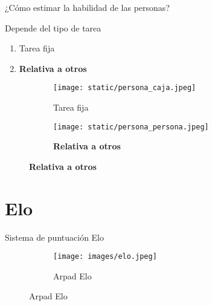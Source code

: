\documentclass[shownotes]{beamer}
\begin{document}
\begin{frame}[noframenumbering]

\begin{mdframed}[backgroundcolor=black!15]
 \centering \Large
 ¿C\'omo estimar la habilidad de las personas?
\end{mdframed}

\vspace{0.25cm}

\begin{center}
 \large Depende del tipo de tarea
\end{center}

\begin{enumerate}
 \item Tarea fija
 \item \textbf{Relativa a otros}
\end{enumerate}

  \begin{figure}[H]     
     \centering
     \begin{subfigure}[b]{0.25\textwidth}
       \texttt{[image: static/persona\_caja.jpeg]} 
     \caption*{Tarea fija}
     \end{subfigure}
     \hspace{1cm}
     \begin{subfigure}[b]{0.25\textwidth}
       \texttt{[image: static/persona\_persona.jpeg]} 
       \caption*{\textbf{Relativa a otros}}
     \end{subfigure}
   \end{figure} 
\end{frame}

\section{Elo}

\begin{frame}

\begin{center}
 \large Sistema de puntuaci\'on Elo
\end{center}


  \begin{figure}[H]     
     \centering
     \begin{subfigure}[b]{0.4\textwidth}
       \texttt{[image: images/elo.jpeg]} 
       \caption*{Arpad Elo}
     \end{subfigure}
\end{figure}


\end{frame}
\end{document}
